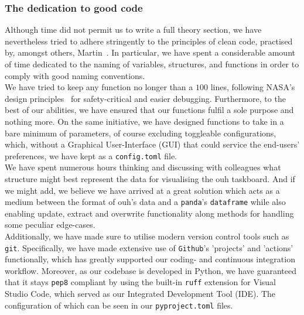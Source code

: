 \subsubsection*{The dedication to good code}
Although time did not permit us to write a full theory section, we have nevertheless tried to adhere stringently to the principles of clean code, practised by, amongst others, Martin~\cite{Clean-Code}. In particular, we have spent a considerable amount of time dedicated to the naming of variables, structures, and functions in order to comply with good naming conventions.
\\
We have tried to keep any function no longer than a \(100\) lines, following NASA's design principles~\cite{Wiki-NASA-code} for safety-critical and easier debugging. Furthermore, to the best of our abilities, we have ensured that our functions fulfil a sole purpose and nothing more. On the same initiative, we have designed functions to take in a bare minimum of parameters, of course excluding toggleable configurations, which, without a Graphical User-Interface (GUI) that could service the end-users' preferences, we have kept as a \texttt{config.toml} file.
\\
We have spent numerous hours thinking and discussing with colleagues what structure might best represent the data for visualising the \acrshort{ouh} taskboard. And if we might add, we believe we have arrived at a great solution which acts as a medium between the format of \acrshort{ouh}'s data and a \texttt{panda}'s \texttt{dataframe} while also enabling update, extract and overwrite functionality along methods for handling some peculiar edge-cases.
\\
Additionally, we have made sure to utilise modern version control tools such as \texttt{git}. Specifically, we have made extensive use of \texttt{Github}'s 'projects' and 'actions' functionally, which has greatly supported our coding- and continuous integration workflow. Moreover, as our codebase is developed in Python, we have guaranteed that it stays \texttt{pep8}\cite{pep8} compliant by using the built-in \texttt{ruff} extension for Visual Studio Code, which served as our Integrated Development Tool (IDE). The configuration of which can be seen in our \texttt{pyproject.toml} files.

